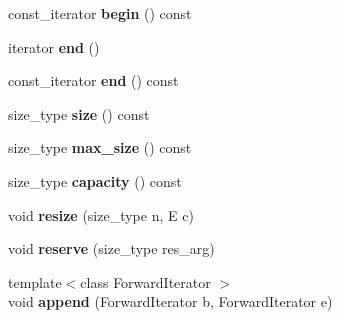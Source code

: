 \begin{DoxyCompactItemize}
\item 
\hypertarget{classAllocatorStringStorage_a6046de590fcdec09f355f57300df8a11}{}const\+\_\+iterator {\bfseries begin} () const \label{classAllocatorStringStorage_a6046de590fcdec09f355f57300df8a11}

\item 
\hypertarget{classAllocatorStringStorage_a289f90e125f9787d0645405bf74bb201}{}iterator {\bfseries end} ()\label{classAllocatorStringStorage_a289f90e125f9787d0645405bf74bb201}

\item 
\hypertarget{classAllocatorStringStorage_a9409bc3727477a898bc5bed4aad3b464}{}const\+\_\+iterator {\bfseries end} () const \label{classAllocatorStringStorage_a9409bc3727477a898bc5bed4aad3b464}

\item 
\hypertarget{classAllocatorStringStorage_a6203336a62366076f037e4469bb3bd0c}{}size\+\_\+type {\bfseries size} () const \label{classAllocatorStringStorage_a6203336a62366076f037e4469bb3bd0c}

\item 
\hypertarget{classAllocatorStringStorage_a301a5da239cbb3fb7422d26f58c8b8ae}{}size\+\_\+type {\bfseries max\+\_\+size} () const \label{classAllocatorStringStorage_a301a5da239cbb3fb7422d26f58c8b8ae}

\item 
\hypertarget{classAllocatorStringStorage_aa4d469033d41a0b5eba74f638fe69fb4}{}size\+\_\+type {\bfseries capacity} () const \label{classAllocatorStringStorage_aa4d469033d41a0b5eba74f638fe69fb4}

\item 
\hypertarget{classAllocatorStringStorage_abc05d0725beaeed74a16a487bb9d9be1}{}void {\bfseries resize} (size\+\_\+type n, E c)\label{classAllocatorStringStorage_abc05d0725beaeed74a16a487bb9d9be1}

\item 
\hypertarget{classAllocatorStringStorage_a2bc87d68b9fb22708f750af02251d9e5}{}void {\bfseries reserve} (size\+\_\+type res\+\_\+arg)\label{classAllocatorStringStorage_a2bc87d68b9fb22708f750af02251d9e5}

\item 
\hypertarget{classAllocatorStringStorage_aadf0ccbbdfaf9cec012ac99f370d4f65}{}{\footnotesize template$<$class Forward\+Iterator $>$ }\\void {\bfseries append} (Forward\+Iterator b, Forward\+Iterator e)\label{classAllocatorStringStorage_aadf0ccbbdfaf9cec012ac99f370d4f65}


\end{DoxyCompactItemize}
